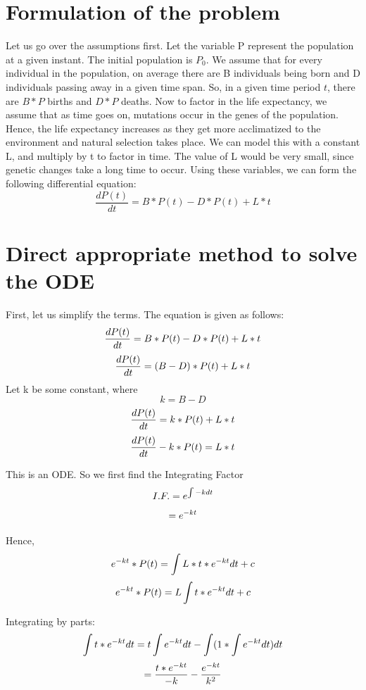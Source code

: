 \documentclass[a4paper]{article}
\begin{document}
\section*{Formulation of the problem}
Let us go over the assumptions first. Let the variable P represent the population at a given instant. The initial population is $P_0$. We assume that for every individual in the population, on average there are B individuals being born and D individuals passing away in a given time span.  So, in a given time period $t$, there are $B*P$ births and $D*P$ deaths.  Now to factor in the life expectancy, we assume that as time goes on, mutations occur in the genes of the population. Hence, the life expectancy increases as they get more acclimatized to the environment and natural selection takes place. We can model this with a constant L, and multiply by t to factor in time. The value of L would be very small, since genetic changes take a long time to occur.   
Using these variables, we can form the following differential equation:
$$
\frac{dP(t)}{dt}= B*P(t) - D*P(t) + L*t
$$
\section*{Direct appropriate method to solve the ODE}
First, let us simplify the terms. The equation is given as follows:
$$
\frac{dP(t)}{dt}= B*P(t) - D*P(t) + L*t  \\
$$
$$
\frac{dP(t)}{dt}= (B-D)*P(t) + L*t \\
$$
Let k be some constant, where
$$
k=B-D 
$$
$$
\frac{dP(t)}{dt}= k*P(t) + L*t \\
$$
$$
\frac{dP(t)}{dt}- k*P(t) = L*t \\
$$

This is an ODE. So we first find the Integrating Factor
$$
I.F. = e^{\int -kdt} \\
$$
$$
 = e^{-kt} \\
$$

Hence,
$$
e^{-kt}*P(t) =  \int L*t*e^{-kt}dt + c \\
$$
$$
e^{-kt}*P(t)=L \int t*e^{-kt}dt + c \\ 
$$

Integrating by parts:
$$
\int t*e^{-kt}dt = t \int e^{-kt} dt - \int (1 * \int e^{-kt}dt)dt \\
$$
$$
= \frac {t*e^{-kt}}{-k} - \frac {e^{-kt}}{k^2} \\
$$
\end{document}

